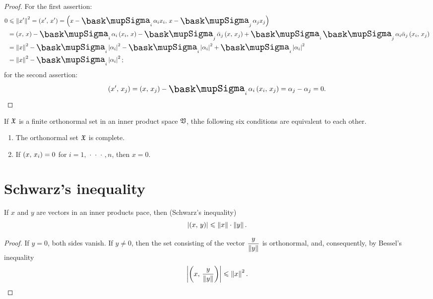 \begin{proof}
    For the first assertion:
    \begin{align*}
        0 &\leq \norm{x'}^2 = \innerprod{x'}{x'} = \innerprod{x - \sumx_i \alpha_i x_i}{x - \sumx_j \alpha_j x_j} \\
        &= \innerprod{x}{x} - \sumx_i \alpha_i \innerprod{x_i}{x} - \sumx_j \bar{\alpha}_j \innerprod{x}{x_j} + \sumx_i \sumx_j \alpha_i \bar{\alpha}_j \innerprod{x_i}{x_j} \\
        &= \norm{x}^2 - \sumx_i \abs{\alpha_i}^2 - \sumx_i \abs{\alpha_i}^2 + \sumx_i \abs{\alpha_i}^2 \\
        &= \norm{x}^2 - \sumx_i \abs{\alpha_i}^2;
    \end{align*}
    for the second assertion:
    \begin{equation*}
        \innerprod{x'}{x_j} = \innerprod{x}{x_j} - \sumx_i \alpha_i \innerprod{x_i}{x_j} = \alpha_j - \alpha_j = 0.
    \end{equation*}
\end{proof}

\begin{theorem}
    If \(\frak{X}\) is a finite orthonormal set in an inner product space \(\mathfrak{V}\), thhe following six conditions are equivalent to each other.
    \begin{enumerate}[wide, label=(\arabic*)]
        \item The orthonormal set \(\frak{X}\) is complete.
        \item If \(\left(x,\,x_i\right) = 0\) for \(i = 1, \, \cdot\, \cdot\, \cdot\,, n\), then \(x = 0\).
    \end{enumerate}
\end{theorem}

\section{Schwarz's inequality}

\begin{thmx}
    If \(x\) and \(y\) are vectors in an inner products pace, then (Schwarz's inequality)
    \begin{equation*}
        \left\lvert\left(x,\,y\right)\right\rvert \leqslant \left\lVert x\right\rVert\cdot\left\lVert y\right\rVert.
    \end{equation*}
\end{thmx}

\begin{proof}
    If \(y = 0\), both sides vanish. If \(y \neq 0\), then the set consisting of the vector \(\displaystyle \frac{y}{\left\lVert y\right\rVert}\) is orthonormal, and, consequently, by Bessel's inequality
    \begin{equation*}
        \left\lvert\left(x,\,\frac{y}{\left\lVert y\right\rVert}\right)\right\rvert \leqslant \left\lVert x\right\rVert^2.
    \end{equation*}
\end{proof}

